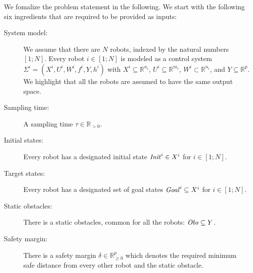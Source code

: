 We fomalize the problem statement in the following.
We start with the following six ingredients that are required to be provided as inputs:
\begin{description}
	\item[System model:] We assume that there are $N$ robots, indexed by the natural numbers $[1;N]$.
	Every robot $i\in [1;N]$ is modeled as a control system $\Sigma^i = (X^i, U^i, W^i, f^i, Y, h^i)$ with $X^i\subseteq \mathbb{R}^{n_i}$, $U^i\subseteq \mathbb{R}^{m_i}$, $W^i\subset \mathbb{R}^{n_i}$, and $Y\subseteq \mathbb{R}^p$.
	We highlight that all the robots are assumed to have the same output space.
	\item[Sampling time:] A sampling time $\tau\in \mathbb{R}_{>0}$.
	\item[Initial states:] Every robot has a designated initial state $\mathit{Init}^i\in X^i$ for $i\in [1;N]$.
	\item[Target states:] Every robot has a designated set of goal states $\mathit{Goal}^i\subseteq X^i$  for $i\in [1;N]$.
	\item[Static obstacles:] There is a static obstacles, common for all the robots: $\mathit{Obs}\subseteq Y$.
	\item[Safety margin:] There is a safety margin $\delta\in \mathbb{R}^p_{\geq 0}$ which denotes the required minimum safe distance from every other robot and the static obstacle.
\end{description}

